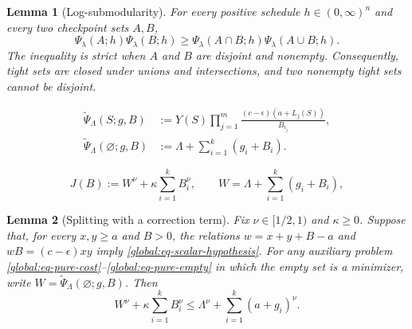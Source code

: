 \documentclass[10pt,a4paper]{amsart}
\newtheorem{lemma}{Lemma}
\begin{document}
\begin{lemma}[Log-submodularity]
\label{global:lem-log-submodularity}
For every positive schedule $h\in(0,\infty)^n$ and every two checkpoint sets $A,B$,
\begin{equation}
  \Psi_\lambda(A;h)\Psi_\lambda(B;h)
  \ge\Psi_\lambda(A\cap B;h)\Psi_\lambda(A\cup B;h).
  \label{global:eq-log-submodularity}
\end{equation}
The inequality is strict when $A$ and $B$ are disjoint and nonempty.
Consequently, tight sets are closed under unions and intersections, and two nonempty tight sets cannot be disjoint.
\end{lemma}

\begin{align}
  \widetilde\Psi_\Lambda(S;g,B)
    &:=Y(S)\prod_{j=1}^m\frac{(c-\epsilon)(a+L_j(S))}{B_{i_j}},
    \label{global:eq-pure-cost}\\
  \widetilde\Psi_\Lambda(\varnothing;g,B)
    &:=\Lambda+\sum_{i=1}^k(g_i+B_i).
    \label{global:eq-pure-empty}
\end{align}

\begin{equation}
  J(B):=W^\nu+\kappa\sum_{i=1}^kB_i^\nu,
  \qquad W=\Lambda+\sum_{i=1}^k(g_i+B_i),
  \label{global:eq-weighted-objective}
\end{equation}

\begin{lemma}[Splitting with a correction term]
\label{lem:weighted-splitting}
Fix $\nu\in[1/2,1)$ and $\kappa\ge0$.
Suppose that, for every $x,y\ge a$ and $B>0$, the relations $w=x+y+B-a$ and $wB=(c-\epsilon) xy$ imply \eqref{global:eq-scalar-hypothesis}.
For any auxiliary problem \eqref{global:eq-pure-cost}--\eqref{global:eq-pure-empty} in which the empty set is a minimizer, write $W=\widetilde\Psi_\Lambda(\varnothing;g,B)$.
Then
\begin{equation}
  W^\nu+\kappa\sum_{i=1}^kB_i^\nu
  \le\Lambda^\nu+\sum_{i=1}^k(a+g_i)^\nu.
  \label{global:eq-weighted-splitting}
\end{equation}
\end{lemma}
\end{document}
